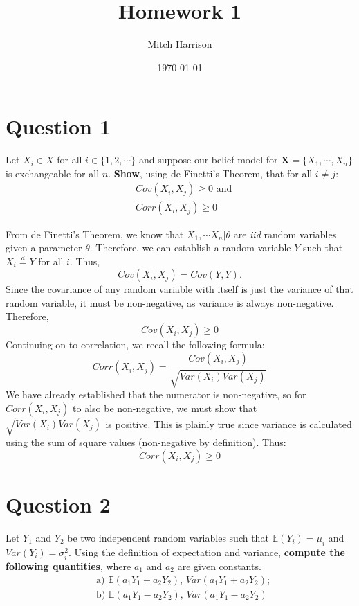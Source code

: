 \documentclass[titlepage, 12pt, leqno]{article}
\title{\Huge{Homework 1}}
\author{\large{Mitch Harrison}}
\date{\today}
\begin{document}
\setlength{\parskip}{1\baselineskip}
\setlength{\parindent}{15pt}
\maketitle
\newpage


\section{Question 1}
\begin{ex}
    Let $X_i \in X$ for all $i \in \{1,2, \cdots\}$ and suppose our belief model
    for $\mathbf{X} = \{X_1, \cdots , X_n\}$ is exchangeable for all $n$. 
    \textbf{Show}, using de Finetti's Theorem, that for all $i \ne j$:
    \begin{align*}
        & Cov(X_i,X_j) \ge 0 \text{ and}\\
        & Corr(X_i, X_j) \ge 0
    \end{align*}
\end{ex}

From de Finetti's Theorem, we know that $X_1, \cdots X_n | \theta$ are 
\textit{iid} random variables given a parameter $\theta$. Therefore, we can 
establish a random variable $Y$ such that $X_i \stackrel{d}{=} Y$ for all $i$.
Thus, 
\[
    Cov(X_i, X_j) = Cov(Y,Y).
\]
Since the covariance of any random variable with itself is just the variance of
that random  variable, it must be non-negative, as variance is always
non-negative. Therefore,
\[
    \boxed{Cov(X_i,X_j) \ge 0} 
\]
Continuing on to correlation, we recall the following formula:
\[
    Corr(X_i, X_j) = \frac{Cov(X_i, X_j)}{\sqrt{Var(X_i)Var(X_j)}}
\]
We have already established that the numerator is non-negative, so for
$Corr(X_i,X_j)$ to also be non-negative, we must show that
$\sqrt{Var(X_i)Var(X_j)}$ is positive. This is plainly true since variance is
calculated using the sum of square values (non-negative by definition). Thus:
\[
    \boxed{Corr(X_i,X_j) \ge 0} 
\]
\pagebreak
\section{Question 2}
\begin{ex}
    Let $Y_1$ and $Y_2$ be two independent random variables such that
    $ \mathbb{E}(Y_i) = \mu_i$ and $Var(Y_i)=\sigma_i^{2}$. Using the definition
    of expectation and variance, \textbf{compute the following quantities}, where
    $a_1$ and $a_2$ are given constants.
    \begin{align*}
        & \text{a) } \mathbb{E}(a_1Y_1 + a_2Y_2) \text{, } Var(a_1Y_1 + a_2Y_2);\\
        & \text{b) } \mathbb{E}(a_1Y_1 - a_2Y_2) \text{, } Var(a_1Y_1 - a_2Y_2)
    \end{align*}
\end{ex}
\end{document}
